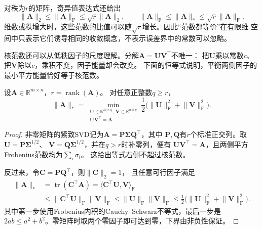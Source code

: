 对秩为$r$的矩阵，奇异值表达式还给出
\begin{equation}
  \lVert\bm{A}\rVert_2\leq\lVert\bm{A}\rVert_{\mathrm{F}}\leq
  \sqrt{r}\lVert\bm{A}\rVert_2,
  \qquad
  \lVert\bm{A}\rVert_{\mathrm{F}}\leq\lVert\bm{A}\rVert_*\leq
  \sqrt{r}\lVert\bm{A}\rVert_{\mathrm{F}}.
  \label{eq:matrix-analysis-norm-rank-relations}
\end{equation}
维数或秩增大时，这些范数的比值可以随$\sqrt{r}$增长。因此“范数都等价”在有限维
空间中只表示它们诱导相同的收敛概念，不表示误差界中的常数可以忽略。

核范数还可以从低秩因子的尺度理解。分解$\bm{A}=\bm{U}\bm{V}^{\top}$不唯一：
把$\bm{U}$乘以常数$c$、把$\bm{V}$除以$c$，乘积不变，因子能量却会改变。
下面的恒等式说明，平衡两侧因子的最小平方能量恰好等于核范数。

\begin{lemma}[核范数的因子分解表达]
\label{lem:matrix-analysis-nuclear-factorization}
设$\bm{A}\in\mathbb{R}^{m\times n}$，$r=\operatorname{rank}(\bm{A})$。
对任意正整数$q\geq r$，
\begin{equation}
 \lVert\bm{A}\rVert_*
 =\min_{\substack{\bm{U}\in\mathbb{R}^{m\times q},\,
                   \bm{V}\in\mathbb{R}^{n\times q}\\
                   \bm{U}\bm{V}^{\top}=\bm{A}}}
   \frac12\bigl(\lVert\bm{U}\rVert_{\mathrm F}^2+
                \lVert\bm{V}\rVert_{\mathrm F}^2\bigr).
 \label{eq:matrix-analysis-nuclear-factorization}
\end{equation}
\end{lemma}

\begin{proof}
非零矩阵的紧致SVD记为$\bm{A}=\bm{P}\bm{\Sigma}\bm{Q}^{\top}$，其中
$\bm{P},\bm{Q}$有$r$个标准正交列。取
$\bm{U}=\bm{P}\bm{\Sigma}^{1/2}$、
$\bm{V}=\bm{Q}\bm{\Sigma}^{1/2}$，并在$q>r$时补零列，便有
$\bm{U}\bm{V}^{\top}=\bm{A}$，且两侧平方Frobenius范数均为$\sum_i\sigma_i$。
这给出等式右侧不超过核范数。

反过来，令$\bm{C}=\bm{P}\bm{Q}^{\top}$，则$\lVert\bm{C}\rVert_2=1$，
且任意可行因子满足
\[
 \begin{aligned}
 \lVert\bm{A}\rVert_*
 &=\operatorname{tr}(\bm{C}^{\top}\bm{A})
   =\langle\bm{C}^{\top}\bm{U},\bm{V}\rangle_{\mathrm F}\\
 &\leq\lVert\bm{C}^{\top}\bm{U}\rVert_{\mathrm F}
       \lVert\bm{V}\rVert_{\mathrm F}
 \leq\lVert\bm{U}\rVert_{\mathrm F}\lVert\bm{V}\rVert_{\mathrm F}
 \leq\frac12\bigl(\lVert\bm{U}\rVert_{\mathrm F}^2+
                  \lVert\bm{V}\rVert_{\mathrm F}^2\bigr).
 \end{aligned}
\]
其中第一步使用Frobenius内积的Cauchy--Schwarz不等式，最后一步是
$2ab\leq a^2+b^2$。零矩阵时取两个零因子即可达到零，下界由非负性保证。
\end{proof}

